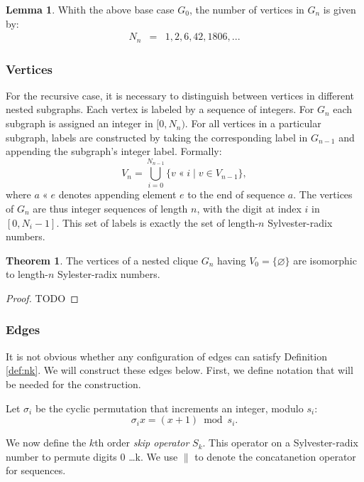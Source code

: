 \documentclass{article}
\theoremstyle{definition}
\newtheorem{lemma}{Lemma}
\newtheorem{theorem}{Theorem}
\DeclareMathOperator{\concat}{\parallel}
\DeclareMathOperator{\append}{\text{«}}
\begin{document}
\begin{lemma}
Whith the above base case $G_0$, the number of vertices in $G_n$ is given by:
\begin{eqnarray}
N_n &=& 1, 2, 6, 42, 1806, ...
\end{eqnarray}
\end{lemma}

\subsubsection{Vertices}

For the recursive case, it is necessary to distinguish between vertices in different nested subgraphs. Each vertex is labeled by a sequence of integers. For $G_n$ each subgraph is assigned an integer in $[0, N_n)$. For all vertices in a particular subgraph, labels are constructed by taking the corresponding label in $G_{n-1}$ and appending the subgraph's integer label. Formally:
\begin{equation}
V_n =
\bigcup_{i = 0}^{N_{n-1}}
\{ v \append i \mid v \in V_{n-1} \},
\end{equation}
where $a \append e$ denotes appending element $e$ to the end of sequence $a$. The vertices of $G_n$ are thus integer sequences of length $n$, with the digit at index $i$ in $[0, N_i-1]$. This set of labels is exactly the set of length-$n$ Sylvester-radix numbers.

\begin{theorem}
The vertices of a nested clique $G_n$ having $V_0 = \{ \varnothing \}$ are isomorphic to length-$n$ Sylester-radix numbers.
\end{theorem}

\begin{proof}
TODO
\end{proof}

\subsubsection{Edges}
It is not obvious whether any configuration of edges can satisfy Definition \ref{def:nk}. We will construct these edges below. First, we define notation that will be needed for the construction.

Let $\sigma_i$ be the cyclic permutation that increments an integer, modulo $s_i$:
\begin{equation}
\sigma_i x = (x + 1) \bmod s_i.
\end{equation}

We now define the $k$th order {\em skip operator} $S_k$. This operator on a Sylvester-radix number to permute digits 0 \ldots k. We use $\concat$ to denote the concatanetion operator for sequences.
\end{document}
